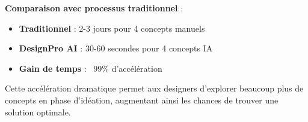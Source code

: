 \textbf{Comparaison avec processus traditionnel} :

\begin{itemize}[leftmargin=*]
    \item \textbf{Traditionnel} : 2-3 jours pour 4 concepts manuels
    \item \textbf{DesignPro AI} : 30-60 secondes pour 4 concepts IA
    \item \textbf{Gain de temps} : ~99\% d'accélération
\end{itemize}

Cette accélération dramatique permet aux designers d'explorer beaucoup plus de concepts en phase d'idéation, augmentant ainsi les chances de trouver une solution optimale.
